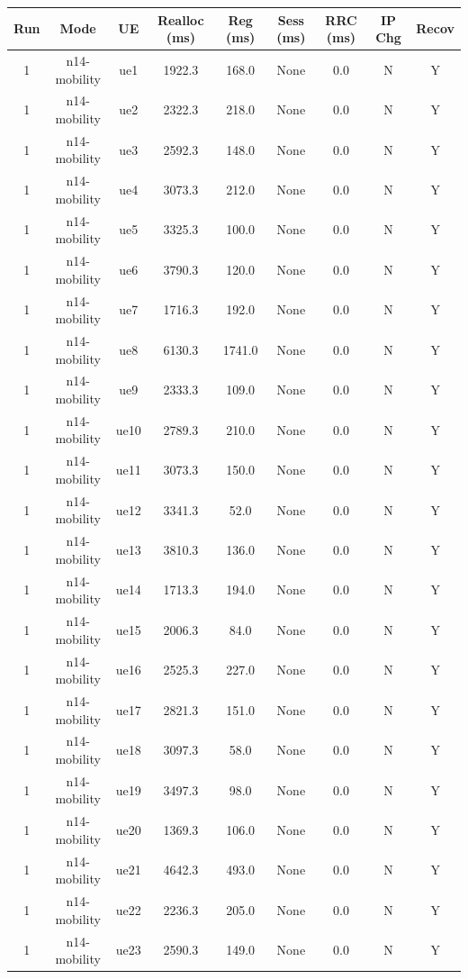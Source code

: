 \begin{table}[ht]
\centering
\begin{tabular}{|c|c|c|c|c|c|c|c|c|}
\hline
Run & Mode & UE & Realloc (ms) & Reg (ms) & Sess (ms) & RRC (ms) & IP Chg & Recov \\
\hline
1 & n14-mobility & ue1 & 1922.3 & 168.0 & None & 0.0 & N & Y \\
1 & n14-mobility & ue2 & 2322.3 & 218.0 & None & 0.0 & N & Y \\
1 & n14-mobility & ue3 & 2592.3 & 148.0 & None & 0.0 & N & Y \\
1 & n14-mobility & ue4 & 3073.3 & 212.0 & None & 0.0 & N & Y \\
1 & n14-mobility & ue5 & 3325.3 & 100.0 & None & 0.0 & N & Y \\
1 & n14-mobility & ue6 & 3790.3 & 120.0 & None & 0.0 & N & Y \\
1 & n14-mobility & ue7 & 1716.3 & 192.0 & None & 0.0 & N & Y \\
1 & n14-mobility & ue8 & 6130.3 & 1741.0 & None & 0.0 & N & Y \\
1 & n14-mobility & ue9 & 2333.3 & 109.0 & None & 0.0 & N & Y \\
1 & n14-mobility & ue10 & 2789.3 & 210.0 & None & 0.0 & N & Y \\
1 & n14-mobility & ue11 & 3073.3 & 150.0 & None & 0.0 & N & Y \\
1 & n14-mobility & ue12 & 3341.3 & 52.0 & None & 0.0 & N & Y \\
1 & n14-mobility & ue13 & 3810.3 & 136.0 & None & 0.0 & N & Y \\
1 & n14-mobility & ue14 & 1713.3 & 194.0 & None & 0.0 & N & Y \\
1 & n14-mobility & ue15 & 2006.3 & 84.0 & None & 0.0 & N & Y \\
1 & n14-mobility & ue16 & 2525.3 & 227.0 & None & 0.0 & N & Y \\
1 & n14-mobility & ue17 & 2821.3 & 151.0 & None & 0.0 & N & Y \\
1 & n14-mobility & ue18 & 3097.3 & 58.0 & None & 0.0 & N & Y \\
1 & n14-mobility & ue19 & 3497.3 & 98.0 & None & 0.0 & N & Y \\
1 & n14-mobility & ue20 & 1369.3 & 106.0 & None & 0.0 & N & Y \\
1 & n14-mobility & ue21 & 4642.3 & 493.0 & None & 0.0 & N & Y \\
1 & n14-mobility & ue22 & 2236.3 & 205.0 & None & 0.0 & N & Y \\
1 & n14-mobility & ue23 & 2590.3 & 149.0 & None & 0.0 & N & Y \\

\end{tabular}
\end{table}
